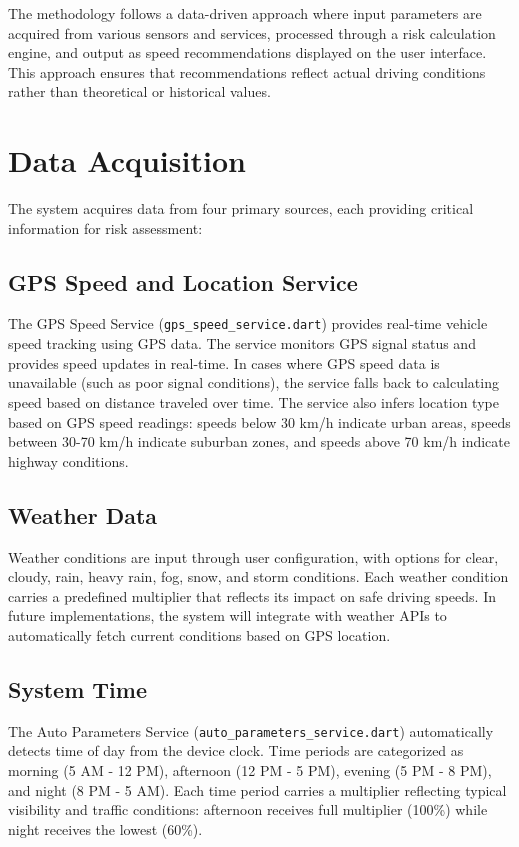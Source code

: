 The methodology follows a data-driven approach where input parameters are acquired from various sensors and services, processed through a risk calculation engine, and output as speed recommendations displayed on the user interface. This approach ensures that recommendations reflect actual driving conditions rather than theoretical or historical values.

\section{Data Acquisition}
The system acquires data from four primary sources, each providing critical information for risk assessment:

\subsection{GPS Speed and Location Service}
The GPS Speed Service (\texttt{gps\_speed\_service.dart}) provides real-time vehicle speed tracking using GPS data. The service monitors GPS signal status and provides speed updates in real-time. In cases where GPS speed data is unavailable (such as poor signal conditions), the service falls back to calculating speed based on distance traveled over time. The service also infers location type based on GPS speed readings: speeds below 30 km/h indicate urban areas, speeds between 30-70 km/h indicate suburban zones, and speeds above 70 km/h indicate highway conditions.

\subsection{Weather Data}
Weather conditions are input through user configuration, with options for clear, cloudy, rain, heavy rain, fog, snow, and storm conditions. Each weather condition carries a predefined multiplier that reflects its impact on safe driving speeds. In future implementations, the system will integrate with weather APIs to automatically fetch current conditions based on GPS location.

\subsection{System Time}
The Auto Parameters Service (\texttt{auto\_parameters\_service.dart}) automatically detects time of day from the device clock. Time periods are categorized as morning (5 AM - 12 PM), afternoon (12 PM - 5 PM), evening (5 PM - 8 PM), and night (8 PM - 5 AM). Each time period carries a multiplier reflecting typical visibility and traffic conditions: afternoon receives full multiplier (100\%) while night receives the lowest (60\%).

